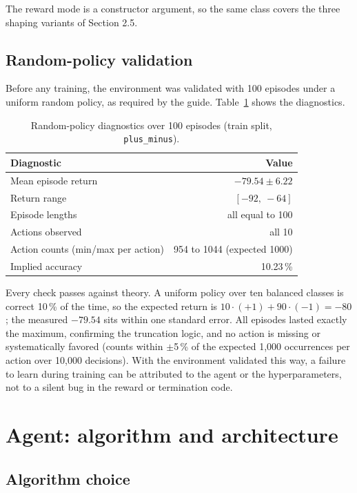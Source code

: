 \documentclass[11pt,a4paper]{article}
\begin{document}
The reward mode is a constructor argument, so the same class covers the three shaping variants of Section 2.5.

\subsection{Random-policy validation}

Before any training, the environment was validated with 100 episodes under a uniform random policy, as required by the guide. Table~\ref{tab:random} shows the diagnostics.

\begin{table}[h]
\centering
\caption{Random-policy diagnostics over 100 episodes (train split, \texttt{plus\_minus}).}
\label{tab:random}
\begin{tabular}{lr}
\toprule
Diagnostic & Value \\
\midrule
Mean episode return & $-79.54 \pm 6.22$ \\
Return range & $[-92,\ -64]$ \\
Episode lengths & all equal to 100 \\
Actions observed & all 10 \\
Action counts (min/max per action) & 954 to 1044 (expected 1000) \\
Implied accuracy & 10.23\,\% \\
\bottomrule
\end{tabular}
\end{table}

Every check passes against theory. A uniform policy over ten balanced classes is correct 10\,\% of the time, so the expected return is $10 \cdot (+1) + 90 \cdot (-1) = -80$; the measured $-79.54$ sits within one standard error. All episodes lasted exactly the maximum, confirming the truncation logic, and no action is missing or systematically favored (counts within $\pm$5\,\% of the expected 1{,}000 occurrences per action over 10{,}000 decisions). With the environment validated this way, a failure to learn during training can be attributed to the agent or the hyperparameters, not to a silent bug in the reward or termination code.

\section{Agent: algorithm and architecture}

\subsection{Algorithm choice}
\end{document}
